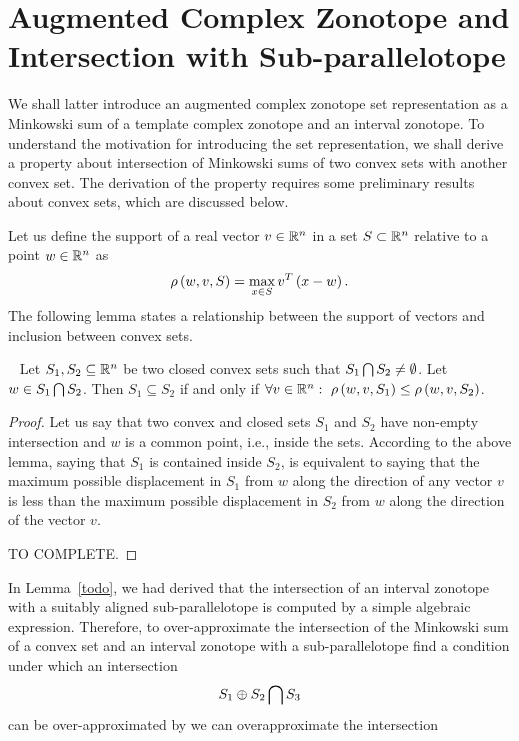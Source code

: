\section{Augmented Complex Zonotope and Intersection with Sub-parallelotope}
We shall latter introduce an augmented complex zonotope set
representation as a Minkowski sum of a template complex zonotope and
an interval zonotope.  To understand the motivation for introducing
the set representation, we shall derive a property about intersection
of Minkowski sums of two convex sets with another convex set.  The
derivation of the property requires some preliminary results about
convex sets, which are discussed below.

Let us define the support of a real vector $v\in\mathbb{R}^n$ in a set
$S\subset\mathbb{R}^n$ relative to a point $w\in\mathbb{R}^n$ as
%
\[
\rho\left(w,v,S\right)=\max_{x\in S}v^T\left(x-w\right).
\]
%
The following lemma
states a relationship between the support of vectors and inclusion
between convex sets.
%
\begin{lemma}~\label{supp-inclusion}
Let $S_1,S_2\subseteq \mathbb{R}^n$ be two closed convex sets such that
$S_1\bigcap S_2\neq \emptyset$.  Let $w\in S_1\bigcap S_2$.
Then $S_1\subseteq S_2$ if and only if $\forall
v\in\mathbb{R}^n:~\rho\left(w,v,S_1\right)\leq \rho\left(w,v,S_2\right)$.
\end{lemma}
%
\begin{proof}
Let us say that two convex and closed sets $S_1$ and $S_2$ have
non-empty intersection and $w$ is a common point, i.e., inside the
sets.  According to the above lemma, saying that $S_1$ is contained
inside $S_2$, is equivalent to saying that the maximum possible
displacement in $S_1$ from $w$ along the direction of any
vector $v$ is less than the maximum possible displacement in $S_2$
from $w$ along the direction of the vector $v$.

{\color{red} TO COMPLETE}.
\end{proof}
%
In Lemma~\ref{todo}, we had derived that the intersection of an
interval zonotope with a suitably aligned sub-parallelotope is
computed by a simple algebraic expression.  Therefore, to over-approximate
the intersection of the Minkowski sum of a convex set and an interval
zonotope with a sub-parallelotope
find a condition under which an intersection
%
\[
S_1\oplus S_2\bigcap S_3
\]
%
can be over-approximated by 
we can overapproximate the intersection
